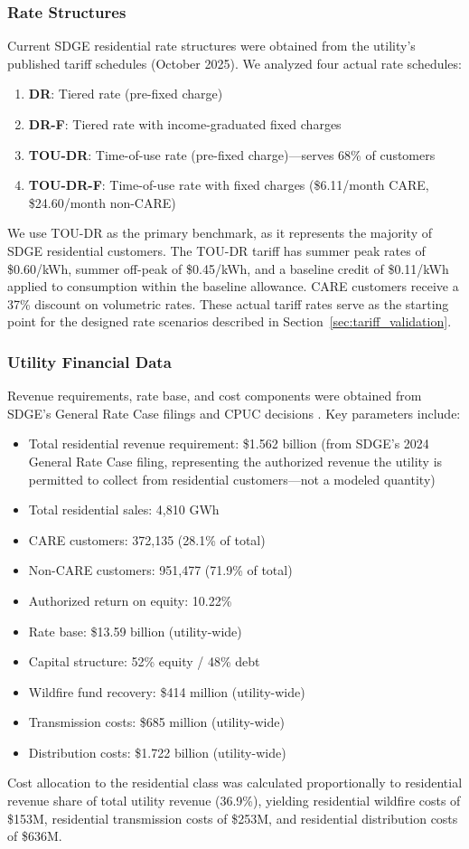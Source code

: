 \documentclass[12pt]{article}
\begin{document}
\subsubsection{Rate Structures}
Current SDGE residential rate structures were obtained from the utility's published tariff schedules (October 2025). We analyzed four actual rate schedules:
\begin{enumerate}
    \item \textbf{DR}: Tiered rate (pre-fixed charge)
    \item \textbf{DR-F}: Tiered rate with income-graduated fixed charges
    \item \textbf{TOU-DR}: Time-of-use rate (pre-fixed charge)---serves 68\% of customers
    \item \textbf{TOU-DR-F}: Time-of-use rate with fixed charges (\$6.11/month CARE, \$24.60/month non-CARE)
\end{enumerate}
We use TOU-DR as the primary benchmark, as it represents the majority of SDGE residential customers. The TOU-DR tariff has summer peak rates of \$0.60/kWh, summer off-peak of \$0.45/kWh, and a baseline credit of \$0.11/kWh applied to consumption within the baseline allowance. CARE customers receive a 37\% discount on volumetric rates. These actual tariff rates serve as the starting point for the designed rate scenarios described in Section~\ref{sec:tariff_validation}.

\subsubsection{Utility Financial Data}
Revenue requirements, rate base, and cost components were obtained from SDGE's General Rate Case filings and CPUC decisions \citep{[GRC citation]}. Key parameters include:
\begin{itemize}
    \item Total residential revenue requirement: \$1.562 billion (from SDGE's 2024 General Rate Case filing, representing the authorized revenue the utility is permitted to collect from residential customers---not a modeled quantity)
    \item Total residential sales: 4,810 GWh
    \item CARE customers: 372,135 (28.1\% of total)
    \item Non-CARE customers: 951,477 (71.9\% of total)
    \item Authorized return on equity: 10.22\%
    \item Rate base: \$13.59 billion (utility-wide)
    \item Capital structure: 52\% equity / 48\% debt
    \item Wildfire fund recovery: \$414 million (utility-wide)
    \item Transmission costs: \$685 million (utility-wide)
    \item Distribution costs: \$1.722 billion (utility-wide)
\end{itemize}
Cost allocation to the residential class was calculated proportionally to residential revenue share of total utility revenue (36.9\%), yielding residential wildfire costs of \$153M, residential transmission costs of \$253M, and residential distribution costs of \$636M.
\end{document}
